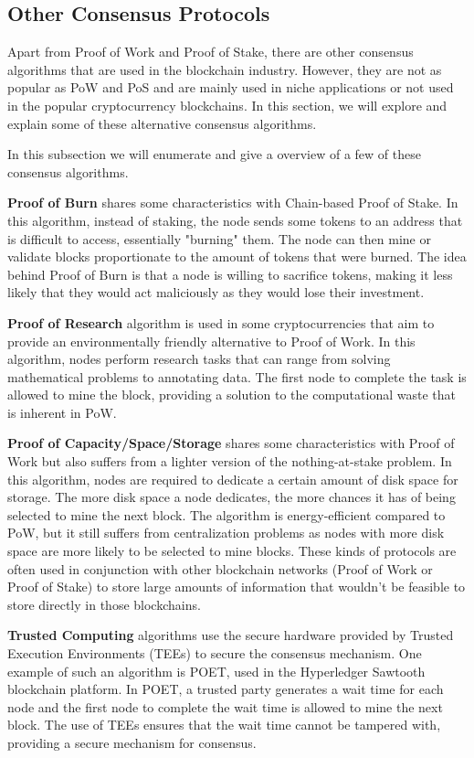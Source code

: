 \subsection*{\textbf{Other Consensus Protocols}}

Apart from Proof of Work and Proof of Stake, there are other consensus algorithms that are used in the blockchain industry. However, they are not as popular as PoW and PoS and are mainly used in niche applications or not used in the popular cryptocurrency blockchains. In this section, we will explore and explain some of these alternative consensus algorithms.

In this subsection we will enumerate and give a overview of a few of these consensus algorithms.

\textbf{Proof of Burn} shares some characteristics with Chain-based Proof of Stake. In this algorithm, instead of staking, the node sends some tokens to an address that is difficult to access, essentially "burning" them. The node can then mine or validate blocks proportionate to the amount of tokens that were burned. The idea behind Proof of Burn is that a node is willing to sacrifice tokens, making it less likely that they would act maliciously as they would lose their investment.

\textbf{Proof of Research} algorithm is used in some cryptocurrencies that aim to provide an environmentally friendly alternative to Proof of Work. In this algorithm, nodes perform research tasks that can range from solving mathematical problems to annotating data. The first node to complete the task is allowed to mine the block, providing a solution to the computational waste that is inherent in PoW.

\textbf{Proof of Capacity/Space/Storage} shares some characteristics with Proof of Work but also suffers from a lighter version of the nothing-at-stake problem. In this algorithm, nodes are required to dedicate a certain amount of disk space for storage. The more disk space a node dedicates, the more chances it has of being selected to mine the next block. The algorithm is energy-efficient compared to PoW, but it still suffers from centralization problems as nodes with more disk space are more likely to be selected to mine blocks. These kinds of protocols are often used in conjunction with other blockchain networks (Proof of Work or Proof of Stake) to store large amounts of information that wouldn't be feasible to store directly in those blockchains.

\textbf{Trusted Computing} algorithms use the secure hardware provided by Trusted Execution Environments (TEEs) to secure the consensus mechanism. One example of such an algorithm is POET, used in the Hyperledger Sawtooth blockchain platform. In POET, a trusted party generates a wait time for each node and the first node to complete the wait time is allowed to mine the next block. The use of TEEs ensures that the wait time cannot be tampered with, providing a secure mechanism for consensus.

